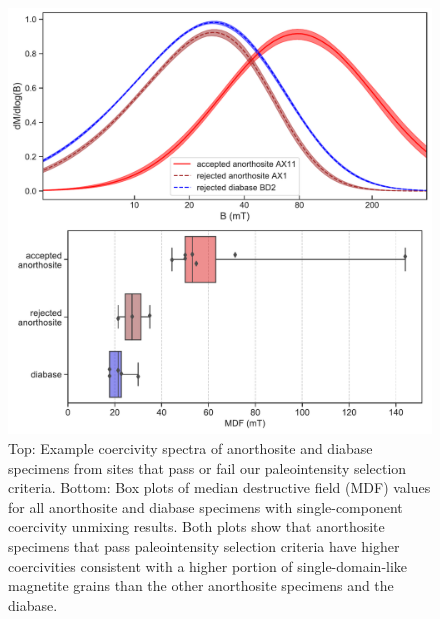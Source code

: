 \documentclass[9pt,twocolumn,twoside,lineno]{pnas-new}
\begin{document}
\begin{figure}
\noindent\includegraphics[width=\linewidth]{coercivity.pdf}
\centering
\caption{\footnotesize{Top: Example coercivity spectra of anorthosite and diabase specimens from sites that pass or fail our paleointensity selection criteria. Bottom: Box plots of median destructive field (MDF) values for all anorthosite and diabase specimens with single-component coercivity unmixing results. Both plots show that anorthosite specimens that pass paleointensity selection criteria have higher coercivities consistent with a higher portion of single-domain-like magnetite grains than the other anorthosite specimens and the diabase.}}
\label{fig:coercivity}
\end{figure}
\end{document}
